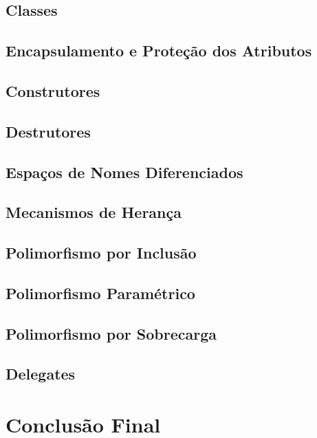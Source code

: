 \documentclass[rel_mlp]{iiufrgs}
\begin{document}
\section{Classes}

\section{Encapsulamento e Proteção dos Atributos}

\section{Construtores}

\section{Destrutores}

\section{Espaços de Nomes Diferenciados}

\section{Mecanismos de Herança}

\section{Polimorfismo por Inclusão}

\section{Polimorfismo Paramétrico}

\section{Polimorfismo por Sobrecarga}

\section{Delegates}

\chapter{Conclusão Final}




\end{document}

